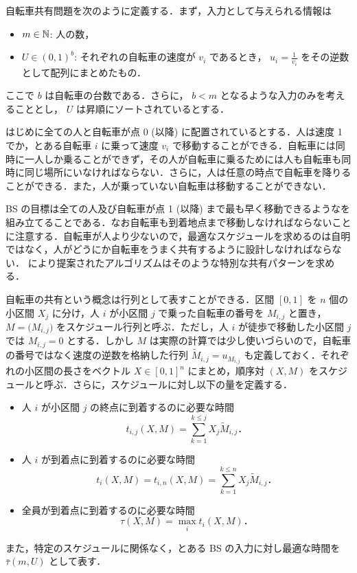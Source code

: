 自転車共有問題を次のように定義する\parencite{czyzowicz}．まず，入力として与えられる情報は
\begin{itemize}
\item $m \in \mathbb{N}$: 人の数，
\item $U \in (0, 1)^{b}$: それぞれの自転車の速度が $v_i$ であるとき， $u_i = \frac{1}{v_i}$ をその逆数として配列にまとめたもの．
\end{itemize}
ここで $b$ は自転車の台数である．さらに， $b < m$ となるような入力のみを考えることとし，  $U$ は昇順にソートされているとする．

はじめに全ての人と自転車が点 0 (以降) に配置されているとする．人は速度 1 でか，とある自転車 $i$ に乗って速度 $v_i$ で移動することができる．自転車には同時に一人しか乗ることができず，その人が自転車に乗るためには人も自転車も同時に同じ場所にいなければならない．さらに，人は任意の時点で自転車を降りることができる．また，人が乗っていない自転車は移動することができない．

BS の目標は全ての人及び自転車が点 1 (以降) まで最も早く移動できるようなを組み立てることである．なお自転車も到着地点まで移動しなければならないことに注意する．自転車が人より少ないので，最適なスケジュールを求めるのは自明ではなく，人がどうにか自転車をうまく共有するように設計しなければならない． \textcite{czyzowicz} により提案されたアルゴリズムはそのような特別な共有パターンを求める．

自転車の共有という概念は行列として表すことができる．区間 $[0, 1]$ を $n$ 個の小区間 $X_j$ に分け，人 $i$ が小区間 $j$ で乗った自転車の番号を $M_{i,j}$ と置き， $M = \big(M_{i,j}\big)$ をスケジュール行列と呼ぶ．ただし，人 $i$ が徒歩で移動した小区間 $j$ では $M_{i,j} = 0$ とする．しかし $M$ は実際の計算では少し使いづらいので，自転車の番号ではなく速度の逆数を格納した行列 $\widetilde{M}_{i, j} = u_{M_{i, j}}$ も定義しておく．それぞれの小区間の長さをベクトル $X \in [0, 1]^{n}$ にまとめ，順序対 $(X, M)$ をスケジュールと呼ぶ．さらに，スケジュールに対し以下の量を定義する．
\begin{itemize}
  \item 人 $i$ が小区間 $j$ の終点に到着するのに必要な時間
  \[
    t_{i,j}(X, M) = \sum_{k = 1}^{k \leq j} X_j \widetilde M_{i, j}．
  \]
\item 人 $i$ が到着点に到着するのに必要な時間
  \[
    t_i(X, M) = t_{i,n}(X, M) = \sum_{k = 1}^{k \leq n} X_j \widetilde M_{i, j}．
  \]
\item 全員が到着点に到着するのに必要な時間
  \[
    \tau(X, M) = \max_{i} t_i(X, M)．
  \]
\end{itemize}
また，特定のスケジュールに関係なく，とある BS の入力に対し最適な時間を $\bar\tau(m, U)$ として表す．

